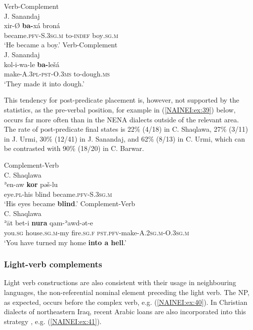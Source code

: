 \documentclass[output=paper,colorlinks,citecolor=brown,draftmode]{langscibook}
\begin{document}
\ea
\ea\label{NAINEI:ex:38a}
 Verb-Complement\\
J. Sanandaj \citep[D:\S 1]{Khan2009JSana} \\
\gll xir-Ø \textbf{ba-}xá broná \\
     became\textsc{.pfv-S.3sg.m} to\textsc{-indef} boy\textsc{.sg.m} \\
\glt `He became a boy.'
\ex\label{NAINEI:ex:38b}
Verb-Complement\\
J. Sanandaj \citep[B:\S 41]{Khan2009JSana} \\
\gll kol-i-wa-le \textbf{ba-}lešá \\
    make\textsc{-A.3pl-pst-O.3ms} to-dough\textsc{.ms} \\
\glt `They made it into dough.'
\z
\z

This tendency for post-predicate placement is, however, not supported by the statistics, as the pre-verbal position, for example in (\ref{NAINEI:ex:39}) below, occurs far more often than in the NENA dialects outside of the relevant area. The rate of post-predicate final states is 22\% (4/18) in C. Shaqlawa, 27\% (3/11) in J. Urmi, 30\% (12/41) in J. Sanandaj, and 62\% (8/13) in C. Urmi, which can be contrasted with 90\% (18/20) in C. Barwar. 

\ea\label{NAINEI:ex:39}
\ea\label{NAINEI:ex:39a}
Complement-Verb\\
C. Shaqlawa \citep[Text 35:§33]{Khanetal2022FolkloreII} \\
\gll ʾen-aw \textbf{kor} pəš-lu \\
     eye\textsc{.pl}-his blind became\textsc{.pfv-S.3sg.m} \\
\glt `His eyes became \textbf{blind}.'
\ex\label{NAINEI:ex:39b}
Complement-Verb\\
C. Shaqlawa \citep[Text 28:§19]{Khanetal2022FolkloreII} \\
\gll ʾāt bet-i \textbf{nura} qam-ʾawd-ət-e \\
    you\textsc{.sg} house\textsc{.sg.m}-my fire\textsc{.sg.f} \textsc{pst.pfv-}make\textsc{-A.2sg.m-O.3sg.m} \\
\glt `You have turned my home \textbf{into a hell}.'
\z
\z

\subsubsection{Light-verb complements}
Light verb constructions are also consistent with their usage in neighbouring languages, the non-referential nominal element preceding the light verb. The  NP, as expected, occurs before the complex verb, e.g. (\ref{NAINEI:ex:40}). In Christian dialects of northeastern Iraq, recent Arabic loans are also incorporated into this strategy \parencite[474--475]{Hakeem2021ArabicNAAnkawa}, e.g. (\ref{NAINEI:ex:41}).
\end{document}
